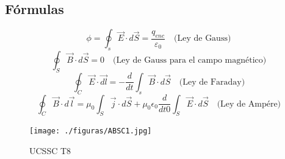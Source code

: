 \documentclass[a4paper,openright,12pt]{report}
\begin{document}
\begin{@twocolumnfalse}
\section*{Fórmulas}

\begin{equation}
\phi = \oint_s \vec{E} \cdot d\vec{S} = \frac{q_{enc}}{\varepsilon_0} \quad \textrm {(Ley de Gauss)} 
\end{equation}
\begin{equation}
\oint_S \vec{B} \cdot d\vec{S} = 0 \quad \textrm {(Ley de Gauss para el campo magnético)} 
\end{equation}
\begin{equation}
\oint_C \vec{E} \cdot \vec{dl} = - \frac{d}{dt} \int_s \vec{B} \cdot d\vec{S} \quad \textrm {(Ley de Faraday)} 
\end{equation}
\begin{equation}
\oint_C \vec{B}\cdot d\vec{l} =\mu_0 \int_S \vec{j} \cdot d\vec{S} + \mu_0 \epsilon_0 \frac{d}{dt0} \int_S \vec{E} \cdot d\vec{S} \quad \textrm {(Ley de Ampére)} 
\end{equation}

\end{@twocolumnfalse}
\begin{figure}[htb]
\begin{center}
\texttt{[image: ./figuras/ABSC1.jpg]}
\caption{UCSSC T8}
\end{center}
\end{figure}

\afterpage{\newpage}
\newpage
{}

\afterpage{\null\newpage}
\end{document}
